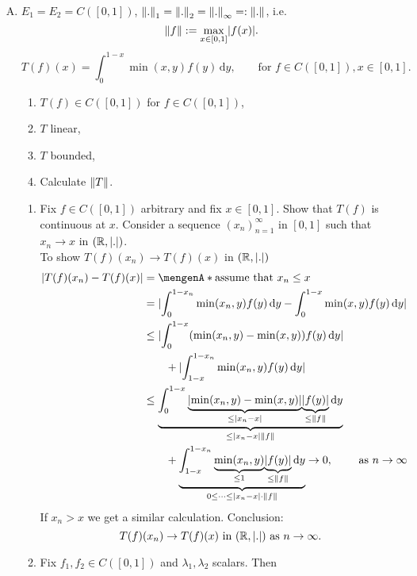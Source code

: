 \begin{beispiele}
	\begin{enumerate}[(A)]
	\item 
	$E_1 = E_2 = C([0,1])$, $\norm{.}_1 = \norm{.}_2 = \norm{.}_{\infty}=: \norm{.}$, i.e.
	\[
		\norm{f} := \max \limits _{x \in [0,1]} \abs{f(x)}.
	\]
	\[
		T(f)(x) = \int_{0}^{1-x} \min(x,y)f(y) \,\mathrm{d}y, \qquad \text{for }f \in C([0,1]), x \in [0,1].
	\]
	\begin{enumerate}[(1)]
		\item $T(f) \in C([0,1])$ for $ f \in C([0,1])$,
		\item $T$ linear,
		\item $T$ bounded,
		\item Calculate $\norm{T}$.
	\end{enumerate}
	\begin{beweis}
		\begin{enumerate}[(1)]
			\item Fix $f \in C([0,1])$ arbitrary and fix $x \in [0,1]$. Show that $T(f)$ is continuous at $x$. Consider a sequence $(x_n)_{n=1}^{\infty}$ in $[0,1]$ such that $x_n \to x$ in $(\mathbb{R},\lvert.\rvert)$. \\
			To show $T(f)(x_n) \to T(f)(x)$ in $(\mathbb{R},\lvert.\rvert)$
			\begin{align*}
				\abs{T(f)(x_n)- T(f)(x)} &= \set{\text{assume that }x_n \leq x} \\
				&= \abs{\int_{0}^{1-x_n}\min(x_n,y)f(y) \,\mathrm{d}y - \int_{0}^{1-x} \min (x,y)f(y) \,\mathrm{d}y} \\
				&\leq  \abs{\int_{0}^{1-x}(\min (x_n,y) - \min(x,y) )f(y) \,\mathrm{d}y} \\ 
				&\qquad  + \abs{\int_{1-x}^{1-x_n}\min(x_n,y)f(y) \,\mathrm{d}y} \\
				&\leq \underset{\leq \abs{x_n-x} \norm{f}}{\underbrace{\int_{0}^{1-x} \underset{\leq \abs{x_n-x }}{\underbrace{\abs{\min (x_n,y) - \min(x,y)}}}
				 \underset{\leq \norm{f}}{\underbrace{\abs{f(y)}}} \,\mathrm{d}y}} \\ 
				& \qquad + \underset{0 \leq \dots \leq \abs{x_n-x}\cdot \norm{f}}{\underbrace{\int_{1-x}^{1-x_n}\underset{\leq
					 	1}{\underbrace{\min(x_n,y)}}\underset{\leq \norm{f}}{\underbrace{\abs{f(y)}}} \,\mathrm{d}y }} \to 0, \qquad \text{ as }n \to \infty
			\end{align*}
			If $x_n > x$ we get a similar calculation. Conclusion: 
			\[
				T(f)(x_n) \to T(f)(x) \text{ in }(\mathbb{R},\lvert.\rvert) \text{ as } n \to \infty.
			\]
			\item Fix $f_1,f_2 \in C([0,1])$ and $\lambda_1, \lambda_2$ scalars. Then

\end{enumerate}
\end{beweis}
\end{enumerate}
\end{beispiele}
